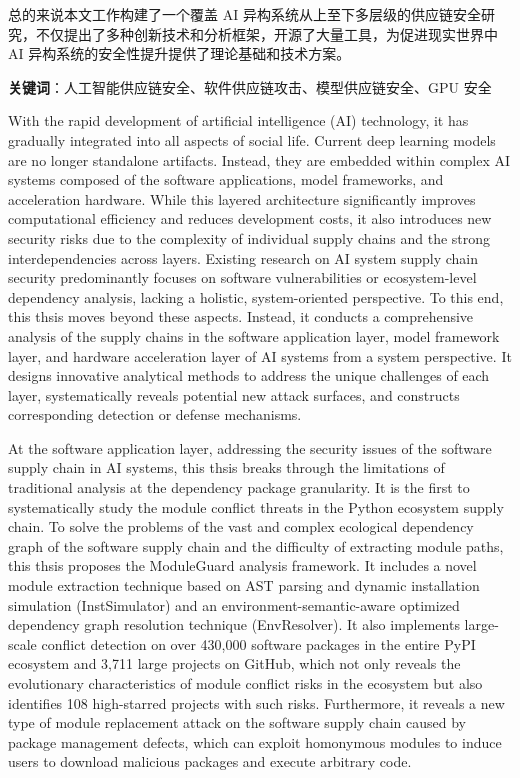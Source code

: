 总的来说本文工作构建了一个覆盖 AI 异构系统从上至下多层级的供应链安全研究，不仅提出了多种创新技术和分析框架，开源了大量工具，为促进现实世界中 AI 异构系统的安全性提升提供了理论基础和技术方案。

\bigskip
\noindent \textbf{关键词}：人工智能供应链安全、软件供应链攻击、模型供应链安全、GPU 安全

\cleardoublepage
{}
With the rapid development of artificial intelligence (AI) technology, it has gradually integrated into all aspects of social life. Current deep learning models are no longer standalone artifacts. Instead, they are embedded within complex AI systems composed of the software applications, model frameworks, and acceleration hardware. While this layered architecture significantly improves computational efficiency and reduces development costs, it also introduces new security risks due to the complexity of individual supply chains and the strong interdependencies across layers. Existing research on AI system supply chain security predominantly focuses on software vulnerabilities or ecosystem-level dependency analysis, lacking a holistic, system-oriented perspective. To this end, this thsis moves beyond these aspects. Instead, it conducts a comprehensive analysis of the supply chains in the software application layer, model framework layer, and hardware acceleration layer of AI systems from a system perspective. It designs innovative analytical methods to address the unique challenges of each layer, systematically reveals potential new attack surfaces, and constructs corresponding detection or defense mechanisms.

At the software application layer, addressing the security issues of the software supply chain in AI systems, this thsis breaks through the limitations of traditional analysis at the dependency package granularity. It is the first to systematically study the module conflict threats in the Python ecosystem supply chain. To solve the problems of the vast and complex ecological dependency graph of the software supply chain and the difficulty of extracting module paths, this thsis proposes the ModuleGuard analysis framework. It includes a novel module extraction technique based on AST parsing and dynamic installation simulation (InstSimulator) and an environment-semantic-aware optimized dependency graph resolution technique (EnvResolver). It also implements large-scale conflict detection on over 430,000 software packages in the entire PyPI ecosystem and 3,711 large projects on GitHub, which not only reveals the evolutionary characteristics of module conflict risks in the ecosystem but also identifies 108 high-starred projects with such risks. Furthermore, it reveals a new type of module replacement attack on the software supply chain caused by package management defects, which can exploit homonymous modules to induce users to download malicious packages and execute arbitrary code.

